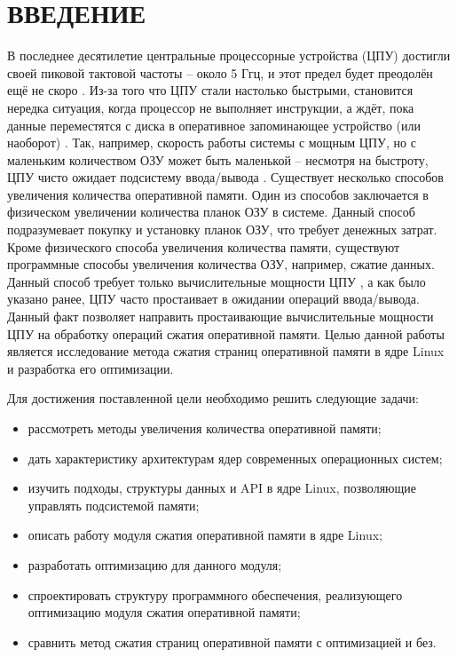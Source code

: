 \section*{ВВЕДЕНИЕ}

В последнее десятилетие центральные процессорные устройства (ЦПУ) достигли своей пиковой тактовой частоты -- около 5 Ггц, и этот предел будет преодолён ещё не скоро \cite{cpu_pick}. Из-за того что ЦПУ стали настолько быстрыми, становится нередка ситуация, когда процессор не выполняет инструкции, а ждёт, пока данные переместятся с диска в оперативное запоминающее устройство (или наоборот) \cite{in-kernel-memory-compression}. Так, например, скорость работы системы с мощным ЦПУ, но с маленьким количеством ОЗУ может быть маленькой -- несмотря на быстроту, ЦПУ чисто ожидает подсистему ввода/вывода \cite{in-kernel-memory-compression}. Существует несколько способов увеличения количества оперативной памяти. Один из способов заключается в физическом увеличении количества планок ОЗУ в системе. Данный способ подразумевает покупку и установку планок ОЗУ, что требует денежных затрат. Кроме физического способа увеличения количества памяти, существуют программные способы увеличения количества ОЗУ, например, сжатие данных. Данный способ требует только вычислительные мощности ЦПУ \cite{data-compression-encyclopedia}, а как было указано ранее, ЦПУ часто простаивает в ожидании операций ввода/вывода. Данный факт позволяет направить простаивающие вычислительные мощности ЦПУ на обработку операций сжатия оперативной памяти. Целью данной работы является исследование метода сжатия страниц оперативной памяти в ядре Linux и разработка его оптимизации.

Для достижения поставленной цели необходимо решить следующие задачи:

\begin{itemize}
	\item рассмотреть методы увеличения количества оперативной памяти;
	\item дать характеристику архитектурам ядер современных операционных систем;
	\item изучить подходы, структуры данных и API \cite{api} в ядре Linux, позволяющие управлять подсистемой памяти;
	\item описать работу модуля сжатия оперативной памяти в ядре Linux;
	\item разработать оптимизацию для данного модуля;
	\item спроектировать структуру программного обеспечения, реализующего оптимизацию модуля сжатия оперативной памяти;
	\item сравнить метод сжатия страниц оперативной памяти с оптимизацией и без.
\end{itemize}

\pagebreak
